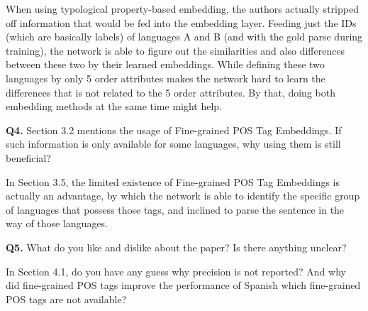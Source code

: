 \documentclass{article}
\begin{document}
When using typological property-based embedding, the authors actually stripped off information that would be fed into the embedding layer. Feeding just the IDs (which are basically labels) of languages A and B (and with the gold parse during training), the network is able to figure out the similarities and also differences between these two by their learned embeddings. While defining these two languages by only 5 order attributes makes the network hard to learn the differences that is not related to the 5 order attributes. By that, doing both embedding methods at the same time might help.

\bigskip

\textbf{Q4.} Section 3.2 mentions the usage of Fine-grained POS Tag Embeddings. If such information is only available for some languages, why using them is still beneficial?

In Section 3.5, the limited existence of Fine-grained POS Tag Embeddings is actually an advantage, by which the network is able to identify the specific group of languages that possess those tags, and inclined to parse the sentence in the way of those languages.

\bigskip

\textbf{Q5.} What do you like and dislike about the paper? Is there anything unclear?

In Section 4.1, do you have any guess why precision is not reported? And why did fine-grained POS tags improve the performance of Spanish which fine-grained POS tags are not available?



\end{document}
